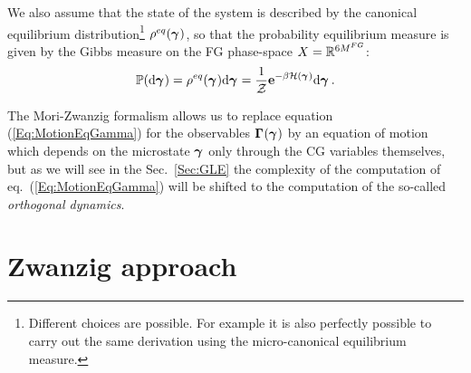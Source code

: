 \documentclass[10pt,a4paper]{book}
\theoremstyle{definition}
\begin{document}
We also assume that the state of the system is described by the canonical equilibrium distribution\footnote{Different choices are possible. For example it is also perfectly possible to carry out the same derivation using the micro-canonical equilibrium measure.} $\rho^{eq}(\boldsymbol\gamma_{})$, so that the probability equilibrium measure is given by the Gibbs measure on the FG phase-space $X=\mathbb{R}^{6M^{FG}}$:
\begin{equation}\label{Eq:GibbsMeas}
 \mathbb{P}(\mbox{d}\boldsymbol\gamma_{})=\rho^{eq}(\boldsymbol\gamma_{})\mbox{d}\boldsymbol\gamma_{}=\frac{1}{\mathcal{Z}}\mathbf{e}^{-\beta\mathcal{H}(\boldsymbol\gamma_{})}\mbox{d}\boldsymbol\gamma_{}\,.
\end{equation}

The Mori-Zwanzig formalism allows us to replace equation (\ref{Eq:MotionEqGamma}) for the observables $\boldsymbol\Gamma_{}(\boldsymbol\gamma_{})$ by an equation of motion which depends on the microstate $\boldsymbol\gamma_{}$ only through the CG variables themselves, but as we will see in the Sec.~\ref{Sec:GLE} the complexity of the computation of eq.~(\ref{Eq:MotionEqGamma}) will be shifted to the computation of the so-called \emph{orthogonal dynamics}.



\section{Zwanzig approach}
\end{document}
